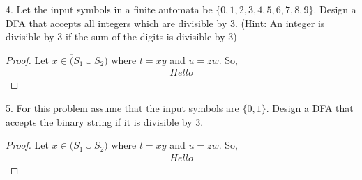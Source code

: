 \documentclass[12pt, letterpaper]{article}
\begin{document}
    4. Let the input symbols in a finite automata be $\{0, 1, 2, 3, 4, 5, 6, 7, 8, 9\}$.
    Design a DFA that accepts all integers which are divisible by $3$. (Hint:
    An integer is divisible by 3 if the sum of the digits is divisible by 3)
    \begin{proof}
        Let $x \in \overline({S_1 \cup S_2})$ where $t=xy$ and $u=zw$. So,
        \begin{align*}
            Hello
        \end{align*}
    \end{proof}

    5. For this problem assume that the input symbols are $\{0, 1\}$. Design a
    DFA that accepts the binary string if it is divisible by 3.
    \begin{proof}
        Let $x \in \overline({S_1 \cup S_2})$ where $t=xy$ and $u=zw$. So,
        \begin{align*}
            Hello
        \end{align*}
    \end{proof}
\end{document}
